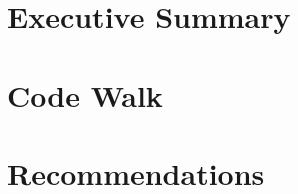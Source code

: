 \documentclass[11pt]{article}
\begin{document}
\maketitle

\section{Executive Summary}

\section{Code Walk}

\section{Recommendations}
\end{document}
